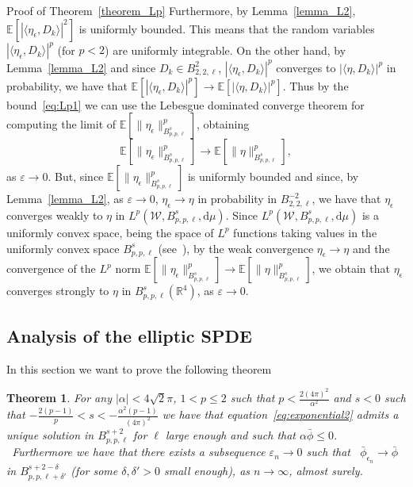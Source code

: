 \documentclass[a4paper,10pt]{article}
\newcommand{\mathd}{\mathrm{d}}
\newenvironment{proof*}[1]{\noindent\textbf{#1\ }}{\hspace*{\fill}$\Box$\medskip}
\newtheorem{theorem}{Theorem}
\begin{document}
\begin{proof*}{Proof of Theorem~\ref{theorem_Lp}}
  Furthermore, by Lemma~\ref{lemma_L2}, $\mathbb{E} [| \langle
  \eta_{\epsilon}, D_k \rangle |^2]$ is uniformly bounded. This means that the
  random variables $| \langle \eta_{\epsilon}, D_k \rangle |^p$ (for $p < 2$)
  are uniformly integrable. On the other hand, by Lemma~\ref{lemma_L2} and
  since $D_k \in B^2_{2, 2, \ell}$, $| \langle \eta_{\epsilon}, D_k \rangle
  |^p$ converges to $| \langle \eta, D_k \rangle |^p$ in probability, we have
  that $\mathbb{E} [| \langle \eta_{\epsilon}, D_k \rangle |^p] \rightarrow
  \mathbb{E} [| \langle \eta, D_k \rangle |^p]$. Thus by the
  bound~{\eqref{eq:Lp1}} we can use the Lebesgue dominated converge theorem
  for computing the limit of $\mathbb{E} [\| \eta_{\epsilon} \|_{B^s_{p, p,
  \ell}}^p]$, obtaining
  \[ \mathbb{E} [\| \eta_{\epsilon} \|_{B^s_{p, p, \ell}}^p] \rightarrow
     \mathbb{E} [\| \eta \|_{B^s_{p, p, \ell}}^p], \]
  as $\varepsilon \rightarrow 0$. But, since $\mathbb{E} [\| \eta_{\epsilon}
  \|_{B^s_{p, p, \ell}}^p]$ is uniformly bounded and since, by
  Lemma~\ref{lemma_L2}, as $\varepsilon \rightarrow 0$, $\eta_{\epsilon}
  \rightarrow \eta$ in probability in $B^{- 2}_{2, 2, \ell}$, we have that
  $\eta_{\epsilon}$ converges weakly to $\eta$ in $L^p (\mathcal{W}, B^s_{p,
  p, \ell}, \mathd \mu)$. Since $L^p (\mathcal{W}, B^s_{p, p, \ell}, \mathd
  \mu)$ is a uniformly convex space, being the space of $L^p$ functions taking
  values in the uniformly convex space $B^s_{p, p, \ell}$
  (see~{\cite{Boyko2009}}), by the weak convergence $\eta_{\epsilon}
  \rightarrow \eta$ and the convergence of the $L^p$ norm $\mathbb{E} [\|
  \eta_{\epsilon} \|_{B^s_{p, p, \ell}}^p] \rightarrow \mathbb{E} [\| \eta
  \|_{B^s_{p, p, \ell}}^p]$, we obtain that $\eta_{\epsilon}$ converges
  strongly to $\eta$ in $B^s_{p, p, \ell} (\mathbb{R}^4)$, as $\varepsilon
  \rightarrow 0$. 
\end{proof*}

\subsection{Analysis of the elliptic SPDE}

In this section we want to prove the following theorem

\begin{theorem}
  \label{theorem_exponentialmain}For any $| \alpha | < 4 \sqrt{2} \pi$, $1 < p
  \leqslant 2$ such that $p < \frac{2 (4 \pi)^2}{\alpha^2}$ and $s < 0$ such
  that $- \frac{2 (p - 1)}{p} < s < - \frac{\alpha^2 (p - 1)}{(4 \pi)^2}$ we
  have that equation~{\eqref{eq:exponential2}} admits a unique solution in
  $B^{s + 2}_{p, p, \ell}$ for $\ell$ large enough and such that $\alpha
  \bar{\phi} \leqslant 0$. \ Furthermore we have that there exists a
  subsequence $\varepsilon_n \rightarrow 0$ such that \
  $\bar{\phi}_{\epsilon_n} \rightarrow \bar{\phi}$ in $B^{s + 2 - \delta}_{p,
  p, \ell + \delta'}$ (for some $\delta, \delta' > 0$ small enough), as $n
  \rightarrow \infty$, almost surely.
\end{theorem}
\end{document}
